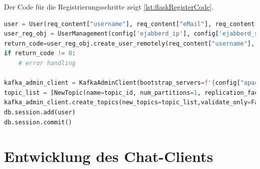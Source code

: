 \documentclass[a4paper,titlepage,halfparskip,12pt]{scrreprt}
\begin{document}
\begin{onehalfspacing}
\pagebreak

Der Code für die Registrierungsschritte zeigt \autoref{lst:flaskRegisterCode}.

\begin{lstlisting}[language=python, caption={Code der \acs{API}-Route für die Benutzerregistrierung}, label={lst:flaskRegisterCode}]
user = User(req_content["username"], req_content["eMail"], req_content["password"], topic_id)
user_reg_obj = UserManagement(config['ejabberd_ip'], config['ejabberd_ssh_user'],priv_key=config['ejabberd_ssh_private_key'], sudo_passwd=config['ejabberd_ssh_sudo_password'])
return_code=user_reg_obj.create_user_remotely(req_content["username"], req_content["password"], config["ejabberd_domain"])
if return_code != 0:
    # error handling

kafka_admin_client = KafkaAdminClient(bootstrap_servers=f'{config["apache_kafka_ip"]}:{config["apache_kafka_port"]}')
topic_list = [NewTopic(name=topic_id, num_partitions=1, replication_factor=1)]
kafka_admin_client.create_topics(new_topics=topic_list,validate_only=False)
db.session.add(user)
db.session.commit()
\end{lstlisting}

\pagebreak

\section{Entwicklung des Chat-Clients}
\label{sec:ClientEntwicklung}


\end{onehalfspacing}
\end{document}
